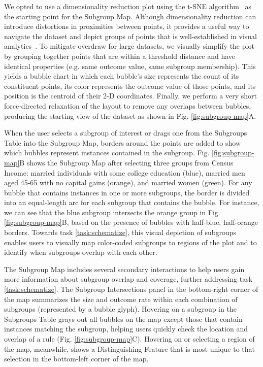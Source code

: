 We opted to use a dimensionality reduction plot using the t-SNE algorithm~\cite{maaten_visualizing_2008} as the starting point for the Subgroup Map.
Although dimensionality reduction can introduce distortions in proximities between points, it provides a useful way to navigate the dataset and depict groups of points that is well-established in visual analytics~\cite{Brehmer_2014_dr}.
To mitigate overdraw for large datasets, we visually simplify the plot by grouping together points that are within a threshold distance and have identical properties (e.g. same outcome value, same subgroup membership). 
This yields a bubble chart in which each bubble's size represents the count of its constituent points, its color represents the outcome value of those points, and its position is the centroid of their 2-D coordinates.
Finally, we perform a very short force-directed relaxation of the layout to remove any overlaps between bubbles, producing the starting view of the dataset as shown in Fig. \ref{fig:subgroup-map}A.

When the user selects a subgroup of interest or drags one from the Subgroups Table into the Subgroup Map, borders around the points are added to show which bubbles represent instances contained in the subgroup. 
Fig. \ref{fig:subgroup-map}B shows the Subgroup Map after selecting three groups from Census Income: married individuals with some college education (blue), married men aged 45-65 with no capital gains (orange), and married women (green).
For any bubble that contains instances in one or more subgroups, the border is divided into an equal-length arc for each subgroup that contains the bubble.
For instance, we can see that the blue subgroup intersects the orange group in Fig. \ref{fig:subgroup-map}B, based on the presence of bubbles with half-blue, half-orange borders.
Towards task \ref{task:schematize}, this visual depiction of subgroups enables users to visually map color-coded subgroups to regions of the plot and to identify when subgroups overlap with each other.

The Subgroup Map includes several secondary interactions to help users gain more information about subgroup overlap and coverage, further addressing task \ref{task:schematize}.
The Subgroup Intersections panel in the bottom-right corner of the map summarizes the size and outcome rate within each combination of subgroups (represented by a bubble glyph).
Hovering on a subgroup in the Subgroups Table grays out all bubbles on the map except those that contain instances matching the subgroup, helping users quickly check the location and overlap of a rule (Fig. \ref{fig:subgroup-map}C).
Hovering on or selecting a region of the map, meanwhile, shows a Distinguishing Feature that is most unique to that selection in the bottom-left corner of the map.

